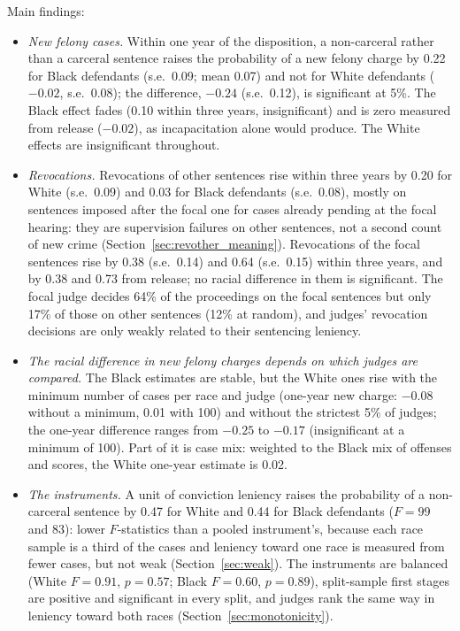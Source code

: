 \documentclass[11pt]{article}
\begin{document}
Main findings:
\begin{itemize}
  \item \emph{New felony cases.} Within one year of the disposition, a non-carceral rather than a carceral sentence raises the probability of a new felony charge by 0.22 for Black defendants (s.e.\ 0.09; mean 0.07) and not for White defendants ($-0.02$, s.e.\ 0.08); the difference, $-0.24$ (s.e.\ 0.12), is significant at 5\%. The Black effect fades (0.10 within three years, insignificant) and is zero measured from release ($-0.02$), as incapacitation alone would produce. The White effects are insignificant throughout.
  \item \emph{Revocations.} Revocations of other sentences rise within three years by 0.20 for White (s.e.\ 0.09) and 0.03 for Black defendants (s.e.\ 0.08), mostly on sentences imposed after the focal one for cases already pending at the focal hearing: they are supervision failures on other sentences, not a second count of new crime (Section~\ref{sec:revother_meaning}). Revocations of the focal sentences rise by 0.38 (s.e.\ 0.14) and 0.64 (s.e.\ 0.15) within three years, and by 0.38 and 0.73 from release; no racial difference in them is significant. The focal judge decides 64\% of the proceedings on the focal sentences but only 17\% of those on other sentences (12\% at random), and judges' revocation decisions are only weakly related to their sentencing leniency.
  \item \emph{The racial difference in new felony charges depends on which judges are compared.} The Black estimates are stable, but the White ones rise with the minimum number of cases per race and judge (one-year new charge: $-0.08$ without a minimum, 0.01 with 100) and without the strictest 5\% of judges; the one-year difference ranges from $-0.25$ to $-0.17$ (insignificant at a minimum of 100). Part of it is case mix: weighted to the Black mix of offenses and scores, the White one-year estimate is 0.02.
  \item \emph{The instruments.} A unit of conviction leniency raises the probability of a non-carceral sentence by 0.47 for White and 0.44 for Black defendants ($F = 99$ and 83): lower $F$-statistics than a pooled instrument's, because each race sample is a third of the cases and leniency toward one race is measured from fewer cases, but not weak (Section~\ref{sec:weak}). The instruments are balanced (White $F = 0.91$, $p = 0.57$; Black $F = 0.60$, $p = 0.89$), split-sample first stages are positive and significant in every split, and judges rank the same way in leniency toward both races (Section~\ref{sec:monotonicity}).

\end{itemize}
\end{document}
